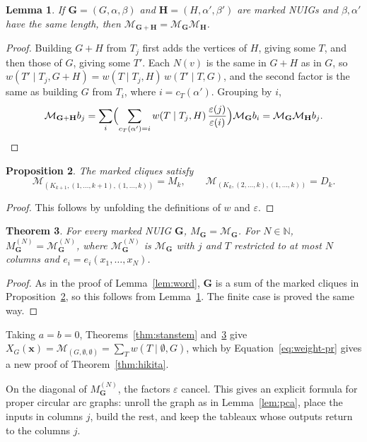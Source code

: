 \documentclass[12pt]{article}
\theoremstyle{plain}
\newtheorem{theorem}{Theorem}
\newtheorem{lemma}[theorem]{Lemma}
\newtheorem{proposition}[theorem]{Proposition}
\theoremstyle{definition}
\theoremstyle{remark}
\newcommand{\bN}{\mathbb{N}}
\newcommand{\bG}{\mathbf{G}}
\newcommand{\bH}{\mathbf{H}}
\begin{document}
\begin{lemma}\label{lem:tableau-mult}
If $\bG=(G,\alpha,\beta)$ and $\bH=(H,\alpha',\beta')$ are marked NUIGs
and $\beta,\alpha'$ have the same length, then
$\mathcal M_{\bG+\bH}=\mathcal M_\bG\mathcal M_\bH$.
\end{lemma}

\begin{proof}
Building $G+H$ from $T_j$ first adds the vertices of $H$, giving some
$T$, and then those of $G$, giving some $T'$. Each $N(v)$ is the same in $G+H$ as in $G$, so
$w(T'\mid T_j,G+H)=w(T\mid T_j,H)\,w(T'\mid T,G)$, and the second factor
is the same as building $G$ from $T_i$, where $i=c_T(\alpha')$. Grouping
by $i$,
\[
\mathcal M_{\bG+\bH}b_j
=\sum_i\Bigl(\sum_{c_T(\alpha')=i}w(T\mid T_j,H)\,
 \frac{\varepsilon(j)}{\varepsilon(i)}\Bigr)\mathcal M_\bG b_i
=\mathcal M_\bG\mathcal M_\bH b_j.
\]
\end{proof}

\begin{proposition}\label{prop:tableau-word}
The marked cliques satisfy
\[
\mathcal M_{(K_{k+1},(1,\dots,k+1),(1,\dots,k))}=M_k,
\qquad
\mathcal M_{(K_k,(2,\dots,k),(1,\dots,k))}=D_k.
\]
\end{proposition}

\begin{proof}
This follows by unfolding the definitions of $w$ and $\varepsilon$.
\end{proof}

\begin{theorem}\label{thm:tableau}
For every marked NUIG $\bG$, $M_\bG=\mathcal M_\bG$. For $N\in\bN$,
$M_\bG^{(N)}=\mathcal M_\bG^{(N)}$, where $\mathcal M_\bG^{(N)}$ is
$\mathcal M_\bG$ with $j$ and $T$ restricted to at most $N$ columns and
$e_i=e_i(x_1,\dots,x_N)$.
\end{theorem}

\begin{proof}
As in the proof of Lemma~\ref{lem:word}, $\bG$ is a sum of the marked
cliques in Proposition~\ref{prop:tableau-word}, so this follows from
Lemma~\ref{lem:tableau-mult}. The finite case is proved the same way.
\end{proof}

Taking $a=b=0$, Theorems~\ref{thm:stanstem} and~\ref{thm:tableau} give
$X_G(\bm x)=\mathcal M_{(G,\emptyset,\emptyset)}=\sum_Tw(T\mid\emptyset,G)$,
which by Equation~\eqref{eq:weight-pr} gives a new proof of
Theorem~\ref{thm:hikita}.

On the diagonal of $M_\bG^{(N)}$, the factors $\varepsilon$ cancel. This
gives an explicit formula for proper circular arc graphs: unroll the
graph as in Lemma~\ref{lem:pca}, place the inputs in columns $j$, build
the rest, and keep the tableaux whose outputs return to the columns $j$.
\end{document}
